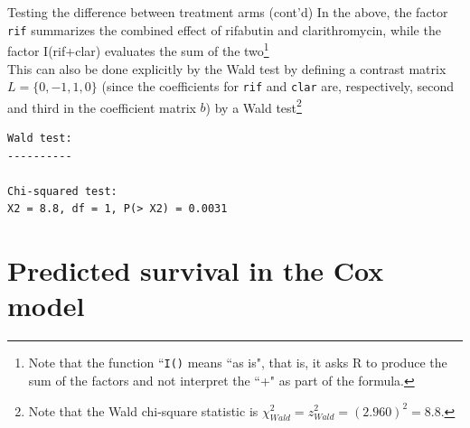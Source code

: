\documentclass[envcountsect, 10pt, portrait, palatino]{beamer}
\begin{document}
\begin{frame}[fragile]{Testing the difference between treatment arms (cont'd)}
In the above, the factor {\tt rif} summarizes the combined effect of rifabutin and clarithromycin, while the factor {I(rif+clar)} evaluates the sum of the two\footnote{Note that the function ``{\tt I()} means ``as is", that is, it asks R to produce the sum of the factors and not interpret the ``+" as part of the formula.}
\\[2ex]
This can also be done explicitly by the Wald test by defining a contrast matrix $L=\{0,-1,1,0\}$ (since the coefficients for {\tt rif} and {\tt clar} are, respectively, second and third in the coefficient matrix $b$) by a Wald test\footnote{Note that the Wald chi-square statistic is $\chi^2_{Wald}=z_{Wald}^2=(2.960)^2=8.8$.}

\small
\begin{verbatim}
Wald test:
----------

Chi-squared test:
X2 = 8.8, df = 1, P(> X2) = 0.0031
\end{verbatim}
\end{frame}

\section{Predicted survival in the Cox model}
\end{document}

